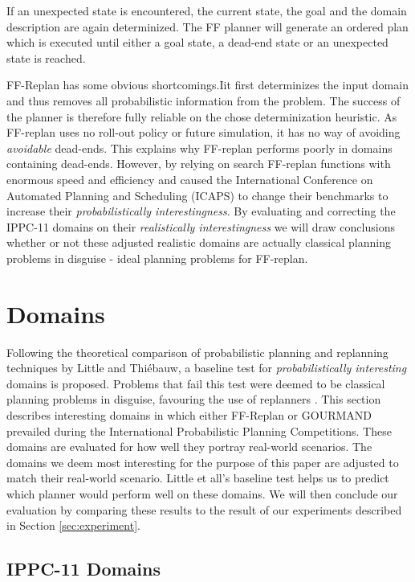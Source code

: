 \documentclass[runningheads,a4paper]{llncs}
\begin{document}
If an unexpected state is encountered, the current state, the goal and the domain description are again determinized. The FF planner will generate an ordered plan which is executed until either a goal state, a dead-end state or an unexpected state is reached. 

FF-Replan has some obvious shortcomings.Iit first determinizes the input domain and thus removes all probabilistic information from the problem. The success of the planner is therefore fully reliable on the chose determinization heuristic. As FF-replan uses no roll-out policy or future simulation, it has no way of avoiding \emph{avoidable} dead-ends. This explains why FF-replan performs poorly in domains containing dead-ends. However, by relying on search FF-replan functions with enormous speed and efficiency and caused the International Conference on Automated Planning and Scheduling (ICAPS) to change their benchmarks to increase their \emph{probabilistically interestingness}. By evaluating and correcting the IPPC-11 domains on their \emph{realistically interestingness} we will draw conclusions whether or not these adjusted realistic domains are actually classical planning problems in disguise - ideal planning problems for FF-replan. 


\section{Domains}
Following the theoretical comparison of probabilistic planning and replanning techniques by Little and Thi\'ebauw, a baseline test for \emph{probabilistically interesting} domains is proposed. Problems that fail this test were deemed to be classical planning problems in disguise, favouring the use of replanners \cite{little2007probvsreplan}. This section describes interesting domains in which either FF-Replan or GOURMAND prevailed during the International Probabilistic Planning Competitions. These domains are evaluated for how well they portray real-world scenarios. The domains we deem most interesting for the purpose of this paper are adjusted to match their real-world scenario. Little et all's baseline test helps us to predict which planner would perform well on these domains. We will then conclude our evaluation by comparing these results to the result of our experiments described in Section \ref{sec:experiment}.

\subsection{IPPC-11 Domains}
\end{document}
